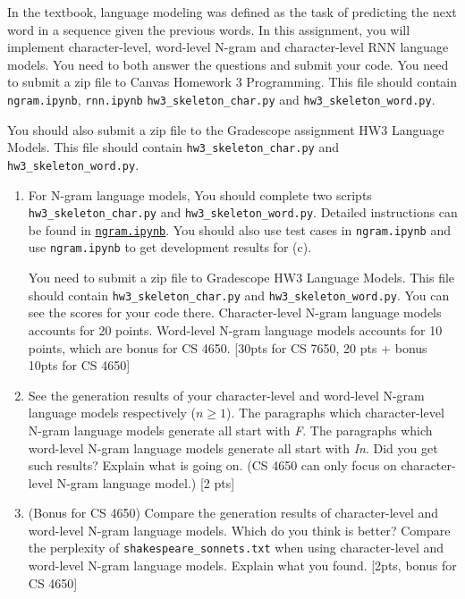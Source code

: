  In the textbook, language modeling was defined as the task of predicting the next word in a sequence given the previous words. In this assignment, you will implement character-level, word-level N-gram  and character-level RNN language models. You need to both answer the questions and submit your code. You need to submit a zip file to Canvas Homework 3 Programming. This file should contain \texttt{ngram.ipynb}, \texttt{rnn.ipynb} \texttt{hw3\_skeleton\_char.py} and \texttt{hw3\_skeleton\_word.py}. 
 
 You should also submit a zip file to the Gradescope assignment HW3 Language Models. 
 This file should contain \texttt{hw3\_skeleton\_char.py} and \texttt{hw3\_skeleton\_word.py}.

\begin{enumerate}
    \item For N-gram language models, You should complete two scripts \texttt{hw3\_skeleton\_char.py} and \texttt{hw3\_skeleton\_word.py}. Detailed instructions can be found in  \href{https://www.cc.gatech.edu/classes/AY2020/cs7650_spring/hw3/lm/ngram.zip} {\texttt{ngram.ipynb}}. You should also use test cases in \texttt{ngram.ipynb} and use \texttt{ngram.ipynb} to get development results for (c). 
    
    You need to submit a zip file to Gradescope HW3 Language Models. This file should contain \texttt{hw3\_skeleton\_char.py} and \texttt{hw3\_skeleton\_word.py}. You can see the scores for your code there. Character-level N-gram language models accounts for 20 points. Word-level N-gram language models accounts for 10 points, which are bonus for CS 4650. [30pts for CS 7650, 20 pts + bonus 10pts for CS 4650] 

     
    \item See the generation results of your character-level and word-level N-gram language models respectively ($n\geq 1$). The paragraphs which character-level N-gram language models generate all start with \textit{F}. The paragraphs which word-level N-gram language models generate all start with \textit{In}. Did you get such results? Explain what is going on. (CS 4650 can only focus on character-level N-gram language model.) [2 pts]
    
    
    \item (Bonus for CS 4650) Compare the generation results of character-level and word-level N-gram language models. Which do you think is better?  Compare the perplexity of \texttt{shakespeare\_sonnets.txt} when using character-level and word-level N-gram language models. Explain what you found. [2pts, bonus for CS 4650]
    

\end{enumerate}
